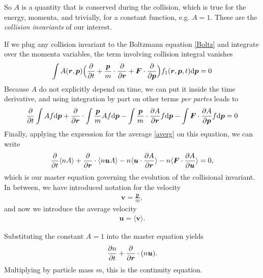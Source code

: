 So $A$ is a quantity that is conserved during the collision, which is true for the energy, momenta, and trivially, for a constant function, e.g. $A=1$.
These are the \textit{collision invariants} of our interest.

If we plug any collision invariant to the Boltzmann equation \ref{Boltz} and integrate over the momenta variables, the term involving collision integral vanishes
\begin{align*}
\int A(\bm{r},\bm{p}) \Big( \frac{\partial }{\partial t} + \frac{\bm{p}}{m}\cdot \frac{\partial}{\partial \bm{r}} + \bm{F} \cdot \frac{\partial}{\partial \bm{p}} \Big) f_1(\bm{r},\bm{p},t) \mathrm{d} \bm{p} = 0
\end{align*} 
Because $A$ do not explicitly depend on time, we can put it inside the time derivative, and using integration by part on other terms \textit{per partes} leads to
\begin{align*}
\frac{\partial}{\partial t} \int A f \mathrm{d}\bm{p} + \frac{\partial}{\partial \bm{r}} \cdot \int \frac{\bm{p}}{m} A f \mathrm{d} \bm{p} - \int \frac{\bm{p}}{m} \cdot \frac{\partial A}{\partial \bm{r}} f \mathrm{d} \bm{p} - \int \bm{F} \cdot \frac{\partial A}{\partial \bm{p}}f \mathrm{d} \bm{p} = 0
\end{align*}
Finally, applying the expression for the average \ref{averg} on this equation, we can write
\begin{align} \label{master}
\frac{\partial}{\partial t} \langle n A \rangle + \frac{\partial}{\partial \bm{r}} \cdot \langle n \bm{u} A \rangle - n \langle\bm{u} \cdot \frac{\partial A}{\partial \bm{r}} \rangle - n \langle \bm{F} \cdot \frac{\partial A}{\partial \bm{u}} \rangle = 0,
\end{align}
which is our master equation governing the evolution of the collisional invariant.
In between, we have introduced notation for the velocity
\begin{align*}
\bm{v} = \frac{\bm{p}}{m},
\end{align*}
and now we introduce the average velocity
\begin{align*}
\bm{u} = \langle \bm{v} \rangle.
\end{align*}


Substituting the constant $A=1$ into the master equation yields
\begin{align*}
\frac{\partial n}{\partial t} + \frac{\partial}{\partial \bm{r}} \cdot (n \bm{u}). 
\end{align*}
Multiplying by particle mass $m$, this is the continuity equation.

